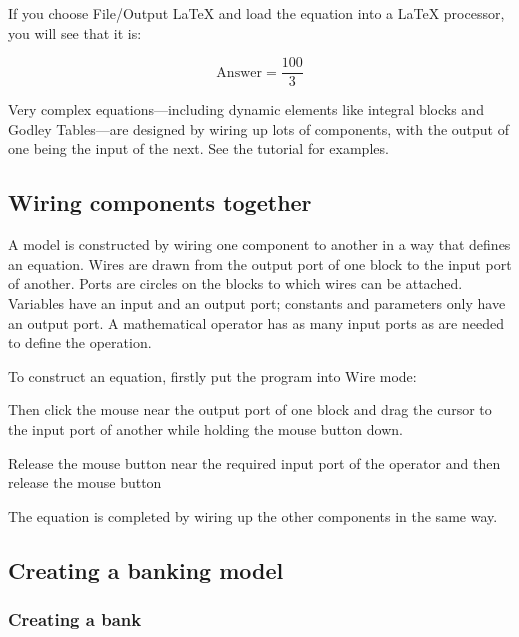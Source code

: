 If you choose File/Output LaTeX and load the equation into a LaTeX processor, you will see that it is:

\begin{displaymath}
\mathrm{Answer}=\frac{100}{3}
\end{displaymath}

Very complex equations---including dynamic elements like integral
blocks and Godley Tables---are designed by wiring up lots of
components, with the output of one being the input of the next. See
the tutorial for examples.

\subsection{Wiring components together}

A model is constructed by wiring one component to another in a way
that defines an equation. Wires are drawn from the output port of one
block to the input port of another. Ports are circles on the blocks to
which wires can be attached. Variables have an input and an output
port; constants and parameters only have an output port. A
mathematical operator has as many input ports as are needed to define
the operation.


To construct an equation, firstly put the program into Wire mode:



Then click the mouse near the output port of one block and drag the
cursor to the input port of another while holding the mouse button
down. 


Release the mouse button near the required input port of the operator
and then release the mouse button



The equation is completed by wiring up the other components in the same way.



\subsection{Creating a banking model}
\label{creatingBankingModel}

\subsubsection{Creating a bank}

